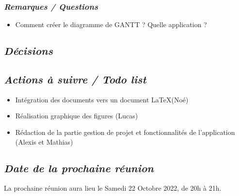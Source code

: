 \documentclass[french,a4paper]{article}
\begin{document}
\subsubsection*{\textit{Remarques / Questions}}
\begin{itemize}
  \item Comment créer le diagramme de GANTT ? Quelle application ?
\end{itemize}

\subsection*{\textit{Décisions}}


\subsection*{\textit{Actions à suivre / Todo list}}
\begin{itemize}
  \item Intégration des documents vers un document \LaTeX \space (Noé)
  \item Réalisation graphique des figures (Lucas)
  \item Rédaction de la partie gestion de projet et fonctionnalités de l'application (Alexis et Mathias)
\end{itemize}

\subsection*{\textit{Date de la prochaine réunion}}
La prochaine réunion aura lieu le Samedi 22 Octobre 2022, de 20h à 21h.
\end{document}
